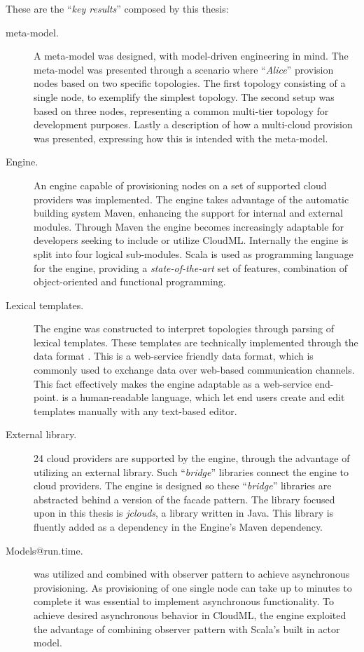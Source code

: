 These are the ``\emph{key results}'' composed by this thesis:
\begin{description}
  \item[meta-model.]
    A meta-model was designed, with model-driven engineering in mind.
    The meta-model was presented through a scenario where ``\emph{Alice}''
    provision nodes based on two specific topologies.
    The first topology consisting of a single node, to exemplify the simplest topology.
    The second setup was based on three nodes, representing a common multi-tier
    topology for development purposes.
    Lastly a description of how a multi-cloud provision was presented, 
    expressing how this is intended with the meta-model.
  \item[Engine.]
    An engine capable of provisioning nodes on a set of supported cloud providers
    was implemented.
    The engine takes advantage of the automatic building system Maven,
    enhancing the support for internal and external modules.
    Through Maven the engine becomes increasingly adaptable for developers
    seeking to include or utilize CloudML.
    Internally the engine is split into four logical sub-modules.
    Scala is used as programming language for the engine,
    providing a \emph{state-of-the-art} set of features,
    \eg combination of object-oriented and functional programming.
  \item[Lexical templates.]
    The engine was constructed to interpret topologies through parsing of lexical templates.
    These templates are technically implemented through the data format .
    This is a web-service friendly data format, which is commonly used to exchange data
    over web-based communication channels.
    This fact effectively makes the engine adaptable as a web-service end-point.
     is a human-readable language, which let end users create and edit
    templates manually with any text-based editor.
  \item[External library.]
    24 cloud providers are supported by the engine, through the advantage of 
    utilizing an external library.
    Such ``\emph{bridge}'' libraries connect the engine to cloud providers.
    The engine is designed so these ``\emph{bridge}'' libraries are abstracted
    behind a version of the facade pattern.
    The library focused upon in this thesis is \emph{jclouds},
    a library written in Java.
    This library is fluently added as a dependency in the Engine's Maven dependency.
  \item[Models@run.time.]
     was utilized and combined with observer pattern to
    achieve asynchronous provisioning.
    As provisioning of one single node can take up to minutes to complete it was
    essential to implement asynchronous functionality.
    To achieve desired asynchronous behavior in CloudML,
    the engine exploited the advantage of combining observer pattern with Scala's
    built in actor model.
\end{description}
